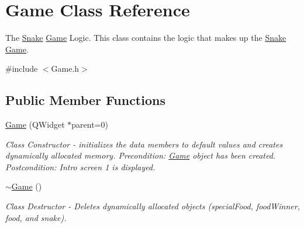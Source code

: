 \hypertarget{classGame}{\section{\-Game \-Class \-Reference}
\label{classGame}
}


\-The \hyperlink{classSnake}{\-Snake} \hyperlink{classGame}{\-Game} \-Logic. \-This class contains the logic that makes up the \hyperlink{classSnake}{\-Snake} \hyperlink{classGame}{\-Game}.  




{\ttfamily \#include $<$\-Game.\-h$>$}

\subsection*{\-Public \-Member \-Functions}
\begin{DoxyCompactItemize}
\item 
\hypertarget{classGame_ae3c64a8dd73de0a99849db8ec0e9a86c}{\hyperlink{classGame_ae3c64a8dd73de0a99849db8ec0e9a86c}{\-Game} (\-Q\-Widget $\ast$parent=0)}\label{classGame_ae3c64a8dd73de0a99849db8ec0e9a86c}

\begin{DoxyCompactList}\small\item\em \-Class \-Constructor -\/ initializes the data members to default values and creates dynamically allocated memory. \-Precondition\-: \hyperlink{classGame}{\-Game} object has been created. \-Postcondition\-: \-Intro screen 1 is displayed. \end{DoxyCompactList}\item 
\hypertarget{classGame_ae3d112ca6e0e55150d2fdbc704474530}{\hyperlink{classGame_ae3d112ca6e0e55150d2fdbc704474530}{$\sim$\-Game} ()}\label{classGame_ae3d112ca6e0e55150d2fdbc704474530}

\begin{DoxyCompactList}\small\item\em \-Class \-Destructor -\/ \-Deletes dynamically allocated objects (special\-Food, food\-Winner, food, and snake). \end{DoxyCompactList}\end{DoxyCompactItemize}
